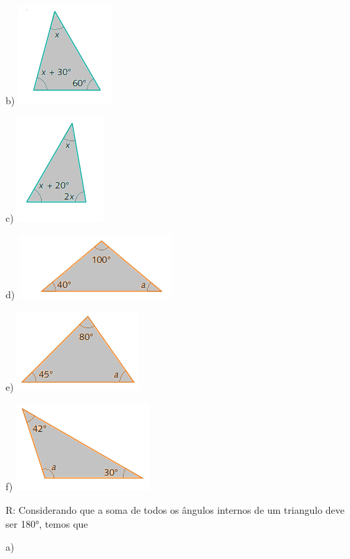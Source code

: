 b)
\includegraphics[width=1.40625in,height=1.47917in]{./imgSAEB_8_MAT/media/image25.png}

c)
\includegraphics[width=1.30208in,height=1.5625in]{./imgSAEB_8_MAT/media/image26.png}

d)
\includegraphics[width=2.33333in,height=0.95833in]{./imgSAEB_8_MAT/media/image27.png}

e)
\includegraphics[width=1.83333in,height=1.1875in]{./imgSAEB_8_MAT/media/image28.png}

f)
\includegraphics[width=2in,height=1.30208in]{./imgSAEB_8_MAT/media/image29.png}

R: Considerando que a soma de todos os ângulos internos de um triangulo
deve ser 180°, temos que

a)

